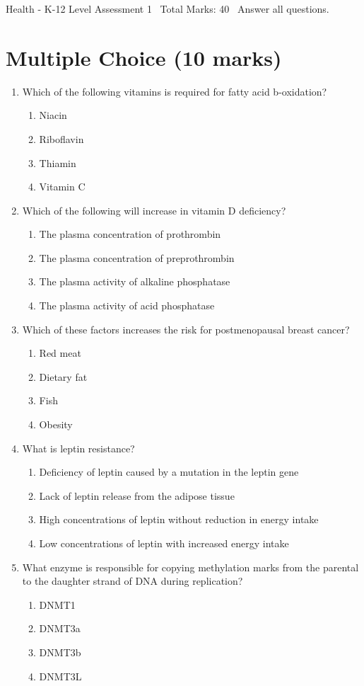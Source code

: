 \documentclass[12pt]{article}
\begin{document}
\begin{center}
Health - K-12 Level Assessment 1 \
Total Marks: 40 \
Answer all questions.
\end{center}

\section*{Multiple Choice (10 marks)}
\begin{enumerate}[label=\arabic*.]
\item Which of the following vitamins is required for fatty acid b-oxidation?
\begin{enumerate}[label=(\alph*)]
    \item Niacin
    \item Riboflavin
    \item Thiamin
    \item Vitamin C
\end{enumerate}
\item Which of the following will increase in vitamin D deficiency?
\begin{enumerate}[label=(\alph*)]
    \item The plasma concentration of prothrombin
    \item The plasma concentration of preprothrombin
    \item The plasma activity of alkaline phosphatase
    \item The plasma activity of acid phosphatase
\end{enumerate}
\item Which of these factors increases the risk for postmenopausal breast cancer?
\begin{enumerate}[label=(\alph*)]
    \item Red meat
    \item Dietary fat
    \item Fish
    \item Obesity
\end{enumerate}
\item What is leptin resistance?
\begin{enumerate}[label=(\alph*)]
    \item Deficiency of leptin caused by a mutation in the leptin gene
    \item Lack of leptin release from the adipose tissue
    \item High concentrations of leptin without reduction in energy intake
    \item Low concentrations of leptin with increased energy intake
\end{enumerate}
\item What enzyme is responsible for copying methylation marks from the parental to the daughter
strand of DNA during replication?
\begin{enumerate}[label=(\alph*)]
    \item DNMT1
    \item DNMT3a
    \item DNMT3b
    \item DNMT3L
\end{enumerate}
\end{enumerate}
\end{document}
